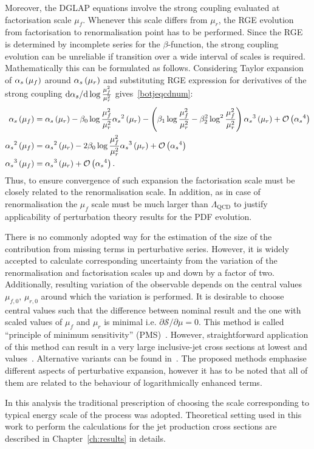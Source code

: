 Moreover, the DGLAP equations involve the strong coupling evaluated at factorisation scale $\mu_f$. Whenever this scale differs from $\mu_r$, the RGE evolution from factorisation to renormalisation point has to be performed. Since the RGE is determined by incomplete series for the $\beta$-function, the strong coupling evolution can be unreliable if transition over a wide interval of scales is required. Mathematically this can be formulated as follows. Considering Taylor expansion of $\mbox{$\alpha_{s}$}\left(\mu_f\right)$ around $\mbox{$\alpha_{s}$}\left(\mu_r\right)$ and substituting RGE expression for derivatives of the strong coupling $\mathrm{d}\mbox{$\alpha_{s}$}/\mathrm{d}\log{\frac{\mu_f^2}{\mu_r^2}}$ gives~\ref{botjeqcdnum}:
{\small
\begin{align}
 \mbox{$\alpha_{s}$}\left(\mu_f\right) &= \mbox{$\alpha_{s}$}\left(\mu_r\right) - \beta_0\log{\frac{\mu_f^2}{\mu_r^2}}\mbox{$\alpha_{s}$}^2\left(\mu_r\right) - \left(\beta_1\log{\frac{\mu_f^2}{\mu_r^2}} - \beta_2^2\log^2{\frac{\mu_f^2}{\mu_r^2}}\right)\mbox{$\alpha_{s}$}^3\left(\mu_r\right) + \mathcal{O}\left(\mbox{$\alpha_{s}$}^4\right)\\ \nonumber
 \mbox{$\alpha_{s}$}^2\left(\mu_f\right) & = \mbox{$\alpha_{s}$}^2\left(\mu_r\right) - 2\beta_0\log{\frac{\mu_f^2}{\mu_r^2}}\mbox{$\alpha_{s}$}^3\left(\mu_r\right) + \mathcal{O}\left(\mbox{$\alpha_{s}$}^4\right)\\
\mbox{$\alpha_{s}$}^3\left(\mu_f\right) & = \mbox{$\alpha_{s}$}^3\left(\mu_r\right) + \mathcal{O}\left(\mbox{$\alpha_{s}$}^4\right).
\end{align}
}
Thus, to ensure convergence of such expansion the factorisation scale must be closely related to the renormalisation scale. In addition, as in case of renormalisation the $\mu_f$ scale must be much larger than $\Lambda_\mathrm{QCD}$ to justify applicability of perturbation theory results for the PDF evolution.

There is no commonly adopted way for the estimation of the size of the contribution from missing terms in perturbative series. However, it is widely accepted to calculate corresponding uncertainty from the variation of the renormalisation and factorisation scales up and down by a factor of two. Additionally, resulting variation of the observable depends on the central values $\mu_{f,0},\,\mu_{r,0}$ around which the variation is performed. It is desirable to choose central values such that the difference between nominal result and the one with scaled values of $\mu_f$ and $\mu_r$ is minimal i.e. $\partial\mathcal{S}/\partial\mu=0$. This method is called ``principle of minimum sensitivity'' (PMS)~\cite{pmsprinciple}. However, straightforward application of this method can result in a very large inclusive-jet cross sections at lowest \qsq and \etjet values~\cite{britzer}. Alternative variants can be found in~\cite{ioffelipatovfadin}. The proposed methods emphasise different aspects of perturbative expansion, however it has to be noted that all of them are related to the behaviour of logarithmically enhanced terms.

In this analysis the traditional prescription of choosing the scale corresponding to typical energy scale of the process was adopted. Theoretical setting used in this work to perform the calculations for the jet production cross sections are described in Chapter~\ref{ch:results} in details.
